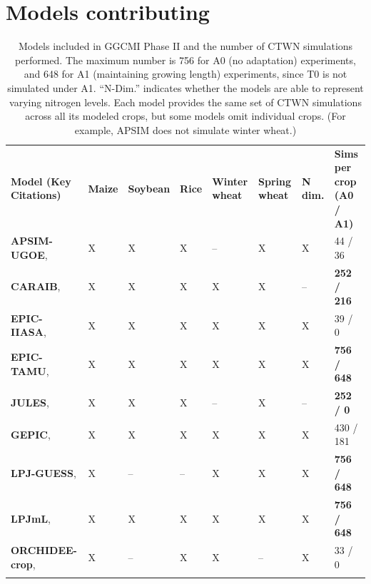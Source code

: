 \documentclass[gmd, manuscript]{copernicus} %
\begin{document}
\section{Models contributing}
\label{S:3}
\begin{table}[t]
\caption{
Models included in GGCMI Phase II and the number of CTWN simulations performed. 
The maximum number is 756 for A0 (no adaptation) experiments, and 648 for A1 (maintaining growing length) experiments, since T0 is not simulated under A1. ``N-Dim.'' indicates whether the models are able to represent varying nitrogen levels.
Each model provides the same set of CTWN simulations across all its modeled crops, but some models omit individual crops. (For example, APSIM does not simulate winter wheat.)
}
\label{table:models}
  \begin{tabular}{p{6cm} p{1cm} p{1cm} p{1cm} p{1cm} p{1cm} p{1cm} p{1.9cm}}
    \tophline
    {\textbf{Model (Key Citations)}}&{\textbf{Maize}}&{\textbf{Soybean}}&{\textbf{Rice}}&{\textbf{Winter wheat}}&{\textbf{Spring wheat}}&{\textbf{N dim.}}&{\textbf{Sims per crop (A0 / A1)}}\\ \middlehline
    {\textbf{APSIM-UGOE},   \citet{KEATING2003267, HOLZWORTH2014327}} & {X} & {X} & {X} & {--} & {X} & {X} & {44 / 36}\\ \middlehline
    {\textbf{CARAIB},       \citet{Dury2011, Pirttioja2015}}  & {X} & {X} & {X} & {X} & {X} & {--} & {\textbf{252 / 216}}\\ \middlehline
    {\textbf{EPIC-IIASA},   \citet{BALKOVIC2014}} & {X} & {X} & {X} & {X} & {X} & {X} & {39 / 0}\\  \middlehline
    {\textbf{EPIC-TAMU},    \citet{Izaurralde06}} & {X} & {X} & {X} & {X} & {X} & {X} & {\textbf{756 / 648}}\\ \middlehline
    {\textbf{JULES},        \citet{Osborne2015, Williams2015, Williams2017}} & {X} & {X} & {X} & {--} & {X} & {--} & {\textbf{252 / 0}}\\ \middlehline
    {\textbf{GEPIC},        \citet{LIU2007478, FOLBERTH201221}} & {X} & {X} & {X} & {X} & {X} & {X} & {430 / 181}\\ \middlehline
    {\textbf{LPJ-GUESS},    \citet{Lindeskog2013, Olin2015}} & {X} & {--} & {--} & {X} & {X} & {X} & {\textbf{756 / 648}}\\  \middlehline
    {\textbf{LPJmL},        \citet{von_Bloh_implementing_2018}} & {X} & {X} & {X} & {X} & {X} & {X} & {\textbf{756 / 648}}\\ \middlehline
    {\textbf{ORCHIDEE-crop},\citet{Wu2016}} & {X} & {--}  & {X} & {X} & {--} & {X} & {33 / 0}\\ \middlehline

\end{tabular}
\end{table}
\end{document}
